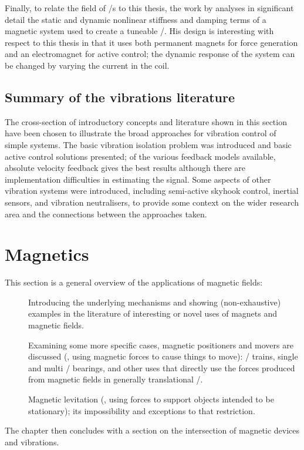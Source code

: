 \documentclass[11pt,a4paper]{memoir}
\begin{document}
Finally, to relate the field of \vibneut/s to this thesis, the work by \textcite{tentor2001} analyses in significant detail the static and dynamic nonlinear stiffness and damping terms of a magnetic system used to create a tuneable \vibneut/.
His design is interesting with respect to this thesis in that it uses both permanent magnets for force generation and an electromagnet for active control; the dynamic response of the system can be changed by varying the current in the coil.



\subsection{Summary of the vibrations literature}

The cross-section of introductory concepts and literature shown in this section have been chosen to illustrate the broad approaches for vibration control of simple systems.
The basic vibration isolation problem was introduced and basic active control solutions presented; of the various feedback models available, absolute velocity feedback gives the best results although there are implementation difficulties in estimating the signal.
Some aspects of other vibration systems were introduced, including semi-active skyhook control, inertial sensors, and vibration neutralisers, to provide some context on the wider research area and the connections between the approaches taken.


\section{Magnetics}


This section is a general overview of the applications of magnetic fields:
\begin{description}
\item[]
Introducing the underlying mechanisms and showing (non-exhaustive) examples in the literature of interesting or novel uses of magnets and magnetic fields.
\item[]
Examining some more specific cases, magnetic positioners and movers are discussed (\ie, using magnetic forces to cause things to move): \maglev/ trains, single and multi \dof/ bearings, and other uses that directly use the forces produced from magnetic fields in generally translational \dofs/.
\item[]
Magnetic levitation (\ie, using forces to support objects intended to be stationary); its impossibility and exceptions to that restriction.
\end{description}
The chapter then concludes with a section on the intersection of magnetic devices and vibrations.
\end{document}
